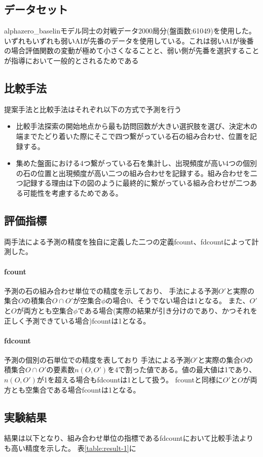 \subsection{データセット}
alphazero\_baselinモデル同士の対戦データ2000局分(盤面数:61049)を使用した。いずれもいずれも弱いAIが先番のデータを使用している。これは弱いAIが後番の場合評価関数の変動が極めて小さくなることと、弱い側が先番を選択することが指導において一般的とされるためである

\subsection{比較手法}
提案手法と比較手法はそれぞれ以下の方式で予測を行う
\begin{itemize}
	\item 比較手法探索の開始地点から最も訪問回数が大きい選択肢を選び、決定木の端までたどり着いた際にそこで四つ繋がっている石の組み合わせ、位置を記録する。
	\item 集めた盤面における4つ繋がっている石を集計し、出現頻度が高い4つの個別の石の位置と出現頻度が高い二つの組み合わせを記録する。組み合わせを二つ記録する理由は下の図のように最終的に繋がっている組み合わせが二つある可能性を考慮するためである。
\end{itemize}

\subsection{評価指標}
両手法による予測の精度を独自に定義した二つの定義fcount、fdcountによって計測した。
\paragraph{fcount}
予測の石の組み合わせ単位での精度を示しており、
手法による予測$O'$と実際の集合$O$の積集合$O\cap O'$が空集合$\phi$の場合0、そうでない場合は1となる。
また、$O'$と$O$が両方とも空集合$\phi$である場合(実際の結果が引き分けのであり、かつそれを正しく予測できている場合)fcountは1となる。
\paragraph{fdcount}
予測の個別の石単位での精度を表しており
手法による予測$O'$と実際の集合$O$の積集合$O\cap O'$の要素数$n(O, O')$を4で割った値である。値の最大値は1であり、$n(O, O')$が1を超える場合もfdcountは1として扱う。
fcountと同様に$O'$と$O$が両方とも空集合である場合fcountは1となる。
\subsection{実験結果}
結果は以下となり、組み合わせ単位の指標であるfdcountにおいて比較手法よりも高い精度を示した。
表\ref{table:result-1}に
